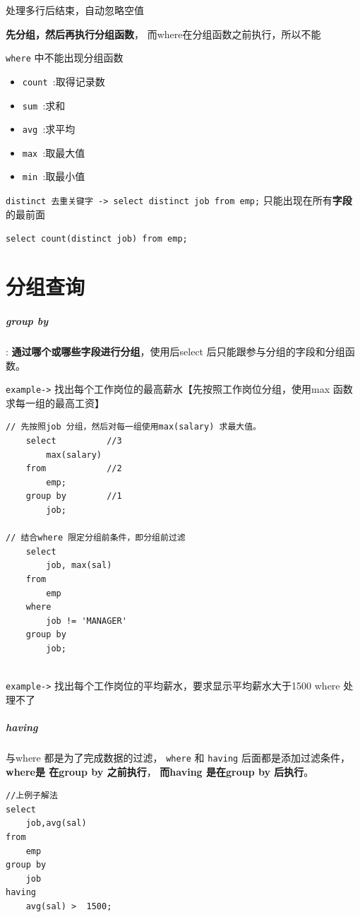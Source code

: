 \documentclass[UTF8,a4paper,12pt]{ctexbook}
\begin{document}
			处理多行后结束，自动忽略空值
			
			\textbf{先分组，然后再执行分组函数}， 而where在分组函数之前执行，所以不能
			
			\verb|where| 中不能出现分组函数
			
			\begin{itemize}[itemindent = 2em]
				\item \verb|count |:取得记录数
				\item \verb|sum |:求和
				\item \verb|avg |:求平均
				\item \verb|max |:取最大值
				\item \verb|min |:取最小值
			\end{itemize}
			
			\verb|distinct 去重关键字 -> select distinct job from emp;|  只能出现在所有\textbf{字段}的最前面
			
			\verb|select count(distinct job) from emp;|
			
	\section{分组查询}
			\subparagraph{group by}: \textbf{通过哪个或哪些字段进行分组}，使用后select 后只能跟参与分组的字段和分组函数。
			
				\verb|example->| 找出每个工作岗位的最高薪水【先按照工作岗位分组，使用max 函数求每一组的最高工资】
				
					\begin{lstlisting}
// 先按照job 分组，然后对每一组使用max(salary) 求最大值。					
	select 			//3
		max(salary)
	from			//2
		emp;
	group by		//1
		job;	
		
// 结合where 限定分组前条件，即分组前过滤
	select
		job, max(sal)
	from 
		emp
	where 
		job != 'MANAGER'
	group by
		job;
	
					\end{lstlisting}
			
				\verb|example->| 找出每个工作岗位的平均薪水，要求显示平均薪水大于1500
				 where  处理不了
				
			\subparagraph{having} 与where 都是为了完成数据的过滤， \verb|where| 和 \verb|having| 后面都是添加过滤条件，\textbf{where是 在group by 之前执行}， \textbf{而having 是在group  by  后执行}。
			
				\begin{lstlisting}
//上例子解法
select 
	job,avg(sal)
from 
	emp
group by
	job
having 
	avg(sal) >  1500;
 
				\end{lstlisting}
			
\end{document}
